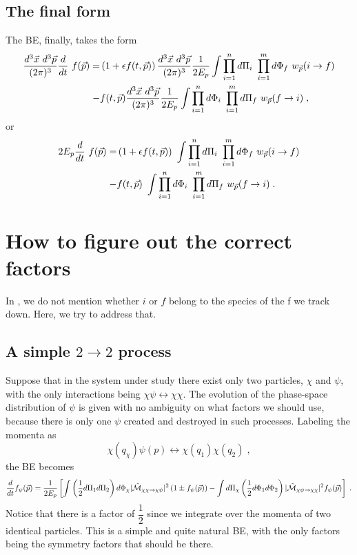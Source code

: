 \documentclass[11pt,a4paper]{article}
\begin{document}
\subsection{The final form}
%
The BE, finally, takes the form
%
\begin{align*}
	\dfrac{d^3 \vec{x} \ d^3 \vec{p}}{(2\pi)^3}	\dfrac{d}{dt}  \ f(\vec{p})=&
		\left(   1+ \epsilon f(t,\vec{p} ) \right) \dfrac{d^3 \vec{x} \ d^3 \vec{p}}{(2\pi)^3} \dfrac{1}{2E_p} 
	\displaystyle \int  \prod_{i=1}^{n} d \Pi_i \ \prod_{i=1}^{m} d \Phi_f 
	\ w_{\vec{p}}(i \to f)    \\
	-&f(t,\vec{p} ) \dfrac{d^3 \vec{x} \ d^3 \vec{p}}{(2\pi)^3} \dfrac{1}{2E_p} 
	\displaystyle \int  \prod_{i=1}^{n} d \Phi_i \ \prod_{i=1}^{m} d \Pi_f 
	\ w_{\vec{p}}(f \to i)  \; ,
\end{align*}
%
or
%
\begin{align}
	2E_p	\dfrac{d}{dt}  \ f(\vec{p})=&	 
	\left(   1+ \epsilon f(t,\vec{p} ) \right) \ \displaystyle \int  \prod_{i=1}^{n} d \Pi_i \ \prod_{i=1}^{m} d \Phi_f 
	\ w_{\vec{p}}(i \to f)    \nonumber \\
	-&
	f(t,\vec{p} ) \ \displaystyle \int  \prod_{i=1}^{n} d \Phi_i \ \prod_{i=1}^{m} d \Pi_f 
	\ w_{\vec{p}}(f \to i)  \; .
	\label{eq:BE_general}
\end{align}



\section{How to figure out the correct factors}\label{sec:Factors}
\setcounter{equation}{0}
%
In , we do not mention whether $i$ or $f$ belong to the species of the f we track down. Here, we try to address that.
\subsection*{A simple $2 \to 2$ process}
Suppose that in the system under study there exist only two particles, $\chi$ and $\psi$, with the only interactions being $\chi \psi \leftrightarrow \chi \chi$. The evolution of the phase-space distribution of $\psi$ is given with no ambiguity on what factors we should use, because there is only one $\psi$ created and destroyed in such processes. Labeling the momenta as  $$\chi(q_\chi) \psi(p) \leftrightarrow \chi(q_1)\chi(q_2) \;,$$ the BE becomes
%
\begin{equation}
\dfrac{d}{dt} f_{\psi }(\vec{p}) = \dfrac{1}{2E_p} \left[ 
\displaystyle \int  \left( \dfrac{1}{2} d\Pi_{1} d\Pi_{2} \right) d\Phi_{\chi}  |\tilde{ \mathcal{M} }_{\chi \chi  \to \chi \psi}|^2 \left( 1\pm f_{\psi }(\vec{p}) \right)
-\displaystyle \int d\Pi_{\chi} \left( \dfrac{1}{2} d\Phi_{1} d\Phi_{2} \right)   |\tilde{ \mathcal{M} }_{\chi \psi \to \chi \chi }|^2 f_{\psi }(\vec{p} )
 \right]\;.
\label{eq:BE_22-psi}
\end{equation}
%
Notice that there is a factor of $\dfrac{1}{2}$ since we integrate  over the momenta of two identical particles. This is a simple and quite natural BE, with the only factors being the symmetry factors that should be there. 
\end{document}
